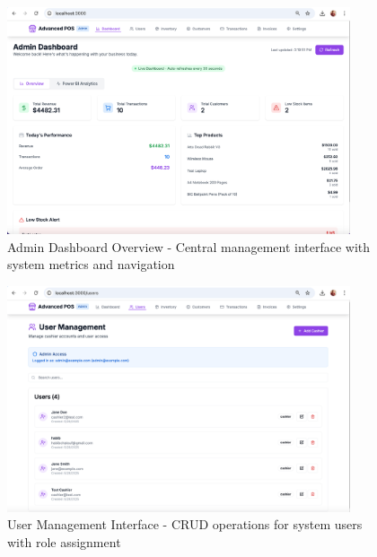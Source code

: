 \begin{figure}[H]
  \centering
  \includegraphics[width=0.9\textwidth]{working app screenshots/adminpanel.png}
  \caption{Admin Dashboard Overview - Central management interface with system metrics and navigation}
  \label{fig:adminpanel}
\end{figure}

\begin{figure}[H]
  \centering
  \includegraphics[width=0.9\textwidth]{working app screenshots/usermanagement.png}
  \caption{User Management Interface - CRUD operations for system users with role assignment}
  \label{fig:usermanagement}
\end{figure}

